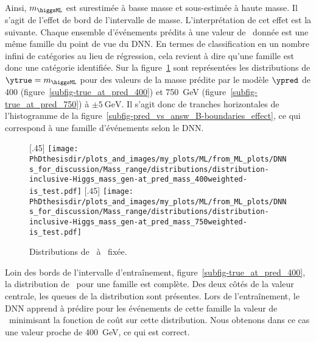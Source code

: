 \par
Ainsi, $m_{\higgsML}$ est surestimée à basse masse
et
sous-estimée à haute masse.
Il s'agit de l'effet de bord de l'intervalle de masse.
L'interprétation de cet effet est la suivante.
Chaque ensemble d'événements prédits à une valeur de \ypred\ donnée est une même famille du point de vue du DNN.
En termes de classification en un nombre infini de catégories au lieu de régression, cela revient à dire qu'une famille est donc une catégorie identifiée.
Sur la figure~\ref{fig-B-boundaries_effect-true_at_pred}
sont représentées les distributions de $\ytrue=m_{\higgsML}$
pour des valeurs de la masse prédite par le modèle $\ypred$ de
\num{400} (figure~\ref{subfig-true_at_pred_400}) et \SI{750}{\GeV} (figure~\ref{subfig-true_at_pred_750})
à $\pm\SI{5}{\GeV}$.
Il s'agit donc de tranches horizontales de l'histogramme de la figure~\ref{subfig-pred_vs_answ_B-boundaries_effect},
ce qui correspond à une famille d'événements selon le DNN.
\begin{figure}[h]
\centering

[.45\textwidth]
{\texttt{[image: \\PhDthesisdir/plots\_and\_images/my\_plots/ML/from\_ML\_plots/DNNs\_for\_discussion/Mass\_range/distributions/distribution-inclusive-Higgs\_mass\_gen-at\_pred\_mass\_400weighted-is\_test.pdf]}\vspace{-.5\baselineskip}}
\hfill
{}[.45\textwidth]
{\texttt{[image: \\PhDthesisdir/plots\_and\_images/my\_plots/ML/from\_ML\_plots/DNNs\_for\_discussion/Mass\_range/distributions/distribution-inclusive-Higgs\_mass\_gen-at\_pred\_mass\_750weighted-is\_test.pdf]}\vspace{-.5\baselineskip}}

\caption{Distributions de \ytrue\ à \ypred\ fixée.}
\label{fig-B-boundaries_effect-true_at_pred}
\end{figure}
\par
Loin des bords de l'intervalle d'entraînement,
figure~\ref{subfig-true_at_pred_400},
la distribution de \ytrue\ pour une famille est complète.
Des deux côtés de la valeur centrale, les queues de la distribution sont présentes.
Lors de l'entraînement,
le DNN \og apprend \fg{} à prédire pour les événements de cette famille
la valeur de \ypred\ minimisant la fonction de coût sur cette distribution.
Nous obtenons dans ce cas une valeur proche de \SI{400}{\GeV}, ce qui est correct.
